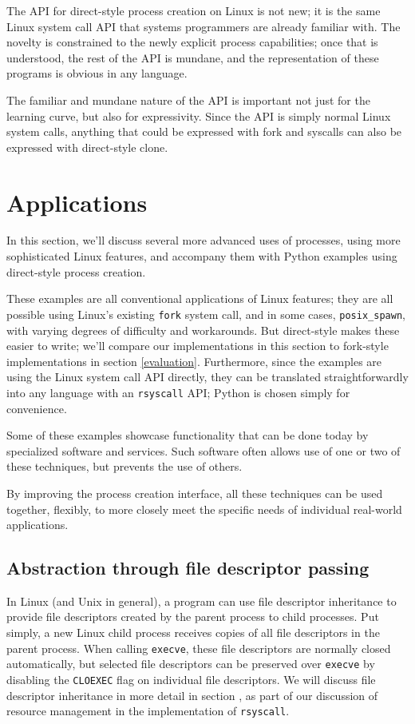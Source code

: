 \documentclass[sigplan]{acmart}
\begin{document}
The API for direct-style process creation on Linux is not new;
it is the same Linux system call API that systems programmers are already familiar with.
The novelty is constrained to the newly explicit process capabilities;
once that is understood, the rest of the API is mundane,
and the representation of these programs is obvious in any language.

The familiar and mundane nature of the API is important not just for the learning curve,
but also for expressivity.
Since the API is simply normal Linux system calls,
anything that could be expressed with fork and syscalls
can also be expressed with direct-style clone.
\section{Applications}\label{applications}
In this section,
we'll discuss several more advanced uses of processes,
using more sophisticated Linux features,
and accompany them with Python examples using direct-style process creation.

These examples are all conventional applications of Linux features;
they are all possible using Linux's existing \texttt{fork} system call,
and in some cases, \verb|posix_spawn|,
with varying degrees of difficulty and workarounds.
But direct-style makes these easier to write;
we'll compare our implementations in this section to fork-style implementations in section \ref{evaluation}.
Furthermore, since the examples are using the Linux system call API directly,
they can be translated straightforwardly into any language with an \texttt{rsyscall} API;
Python is chosen simply for convenience.

Some of these examples showcase functionality that can be done today by specialized software and services.
Such software often allows use of one or two of these techniques, but prevents the use of others.

By improving the process creation interface,
all these techniques can be used together, flexibly,
to more closely meet the specific needs of individual real-world applications.
\subsection{Abstraction through file descriptor passing}\label{fd_abstraction}
In Linux (and Unix in general),
a program can use file descriptor inheritance
to provide file descriptors created by the parent process to child processes.
Put simply,
a new Linux child process receives copies of all file descriptors in the parent process.
When calling \texttt{execve}, these file descriptors are normally closed automatically,
but selected file descriptors can be preserved over \texttt{execve}
by disabling the \texttt{CLOEXEC} flag on individual file descriptors.
We will discuss file descriptor inheritance in more detail in section \label{fdtables},
as part of our discussion of resource management in the implementation of \texttt{rsyscall}.
\end{document}
